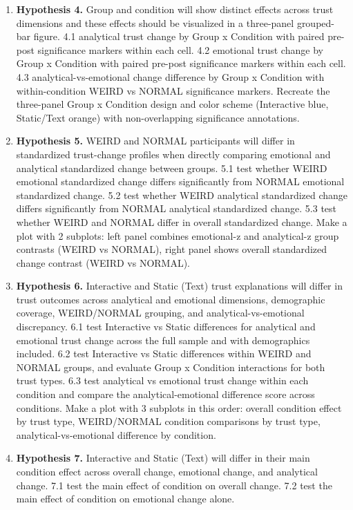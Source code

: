 \begin{enumerate}
\item \textbf{Hypothesis 4.} Group and condition will show distinct effects across trust dimensions and these effects should be visualized in a three-panel grouped-bar figure.
4.1 analytical trust change by Group x Condition with paired pre-post significance markers within each cell.
4.2 emotional trust change by Group x Condition with paired pre-post significance markers within each cell.
4.3 analytical-vs-emotional change difference by Group x Condition with within-condition WEIRD vs NORMAL significance markers.
Recreate the three-panel Group x Condition design and color scheme (Interactive blue, Static/Text orange) with non-overlapping significance annotations.
\item \textbf{Hypothesis 5.} WEIRD and NORMAL participants will differ in standardized trust-change profiles when directly comparing emotional and analytical standardized change between groups.
5.1 test whether WEIRD emotional standardized change differs significantly from NORMAL emotional standardized change.
5.2 test whether WEIRD analytical standardized change differs significantly from NORMAL analytical standardized change.
5.3 test whether WEIRD and NORMAL differ in overall standardized change.
Make a plot with 2 subplots: left panel combines emotional-z and analytical-z group contrasts (WEIRD vs NORMAL), right panel shows overall standardized change contrast (WEIRD vs NORMAL).
\item \textbf{Hypothesis 6.} Interactive and Static (Text) trust explanations will differ in trust outcomes across analytical and emotional dimensions, demographic coverage, WEIRD/NORMAL grouping, and analytical-vs-emotional discrepancy.
6.1 test Interactive vs Static differences for analytical and emotional trust change across the full sample and with demographics included.
6.2 test Interactive vs Static differences within WEIRD and NORMAL groups, and evaluate Group x Condition interactions for both trust types.
6.3 test analytical vs emotional trust change within each condition and compare the analytical-emotional difference score across conditions.
Make a plot with 3 subplots in this order: overall condition effect by trust type, WEIRD/NORMAL condition comparisons by trust type, analytical-vs-emotional difference by condition.
\item \textbf{Hypothesis 7.} Interactive and Static (Text) will differ in their main condition effect across overall change, emotional change, and analytical change.
7.1 test the main effect of condition on overall change.
7.2 test the main effect of condition on emotional change alone.

\end{enumerate}
